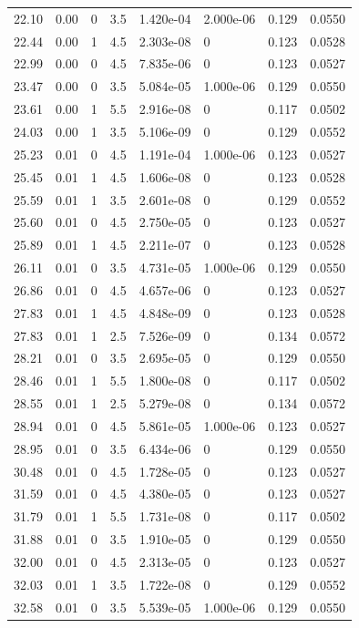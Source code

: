 \documentclass[preview]{standalone}
\begin{document}
{{{\begin{tabular}{L{1.2cm}C{1.2cm} C{0.3cm}C{0.5cm} C{1.4cm}C{1.4cm} C{1.4cm}C{1.4cm}}
  22.10  &  0.00  & 0     & 3.5 &  1.420e-04  & 2.000e-06  & 0.129 &  0.0550   \\ 
  22.44  &  0.00  & 1     & 4.5 &  2.303e-08  & 0  & 0.123 &  0.0528   \\ 
  22.99  &  0.00  & 0     & 4.5 &  7.835e-06  & 0  & 0.123 &  0.0527   \\ 
  23.47  &  0.00  & 0     & 3.5 &  5.084e-05  & 1.000e-06  & 0.129 &  0.0550   \\ 
  23.61  &  0.00  & 1     & 5.5 &  2.916e-08  & 0  & 0.117 &  0.0502   \\ 
  24.03  &  0.00  & 1     & 3.5 &  5.106e-09  & 0  & 0.129 &  0.0552   \\ 
  25.23  &  0.01  & 0     & 4.5 &  1.191e-04  & 1.000e-06  & 0.123 &  0.0527   \\ 
  25.45  &  0.01  & 1     & 4.5 &  1.606e-08  & 0  & 0.123 &  0.0528   \\ 
  25.59  &  0.01  & 1     & 3.5 &  2.601e-08  & 0  & 0.129 &  0.0552   \\ 
  25.60  &  0.01  & 0     & 4.5 &  2.750e-05  & 0  & 0.123 &  0.0527   \\ 
  25.89  &  0.01  & 1     & 4.5 &  2.211e-07  & 0  & 0.123 &  0.0528   \\ 
  26.11  &  0.01  & 0     & 3.5 &  4.731e-05  & 1.000e-06  & 0.129 &  0.0550   \\ 
  26.86  &  0.01  & 0     & 4.5 &  4.657e-06  & 0  & 0.123 &  0.0527   \\ 
  27.83  &  0.01  & 1     & 4.5 &  4.848e-09  & 0  & 0.123 &  0.0528   \\ 
  27.83  &  0.01  & 1     & 2.5 &  7.526e-09  & 0  & 0.134 &  0.0572   \\ 
  28.21  &  0.01  & 0     & 3.5 &  2.695e-05  & 0  & 0.129 &  0.0550   \\ 
  28.46  &  0.01  & 1     & 5.5 &  1.800e-08  & 0  & 0.117 &  0.0502   \\ 
  28.55  &  0.01  & 1     & 2.5 &  5.279e-08  & 0  & 0.134 &  0.0572   \\ 
  28.94  &  0.01  & 0     & 4.5 &  5.861e-05  & 1.000e-06  & 0.123 &  0.0527   \\ 
  28.95  &  0.01  & 0     & 3.5 &  6.434e-06  & 0  & 0.129 &  0.0550   \\ 
  30.48  &  0.01  & 0     & 4.5 &  1.728e-05  & 0  & 0.123 &  0.0527   \\ 
  31.59  &  0.01  & 0     & 4.5 &  4.380e-05  & 0  & 0.123 &  0.0527   \\ 
  31.79  &  0.01  & 1     & 5.5 &  1.731e-08  & 0  & 0.117 &  0.0502   \\ 
  31.88  &  0.01  & 0     & 3.5 &  1.910e-05  & 0  & 0.129 &  0.0550   \\ 
  32.00  &  0.01  & 0     & 4.5 &  2.313e-05  & 0  & 0.123 &  0.0527   \\ 
  32.03  &  0.01  & 1     & 3.5 &  1.722e-08  & 0  & 0.129 &  0.0552   \\ 
  32.58  &  0.01  & 0     & 3.5 &  5.539e-05  & 1.000e-06  & 0.129 &  0.0550   \\ 
\hline 
\end{tabular} 

}}}
\end{document}
